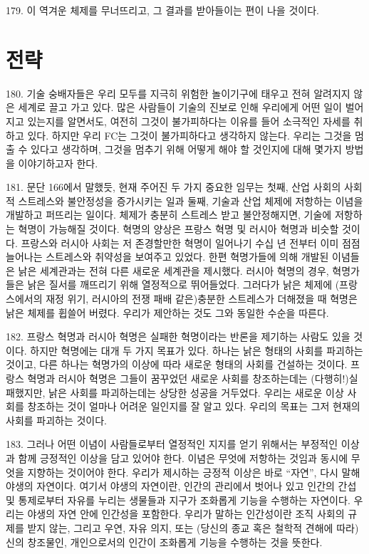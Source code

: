 \documentclass[11pt,a4paper]{article}
\begin{document}
\begin{multicols}{2}
179. 이 역겨운 체제를 무너뜨리고, 그 결과를 받아들이는 편이 나을 것이다.  


\section*{전략}
180. 기술 숭배자들은 우리 모두를 지극히 위험한 놀이기구에 태우고 전혀 알려지지 않은 세계로 끌고  가고 있다. 많은 사람들이 기술의 진보로 인해 우리에게 어떤 일이 벌어지고 있는지를 알면서도, 여전히  그것이 불가피하다는 이유를 들어 소극적인 자세를 취하고 있다. 하지만 우리 FC는 그것이 불가피하다고  생각하지 않는다. 우리는 그것을 멈출 수 있다고 생각하며, 그것을 멈추기 위해 어떻게 해야 할 것인지에  대해 몇가지 방법을 이야기하고자 한다.  


181. 문단 166에서 말했듯, 현재 주어진 두 가지 중요한 임무는 첫째, 산업 사회의 사회적 스트레스와  불안정성을 증가시키는 일과 둘째, 기술과 산업 체제에 저항하는 이념을 개발하고 퍼뜨리는 일이다.  체제가 충분히 스트레스 받고 불안정해지면, 기술에 저항하는 혁명이 가능해질 것이다. 혁명의 양상은  프랑스 혁명 및 러시아 혁명과 비슷할 것이다. 프랑스와 러시아 사회는 저 존경할만한 혁명이 일어나기  수십 년 전부터 이미 점점 늘어나는 스트레스와 취약성을 보여주고 있었다. 한편 혁명가들에 의해 개발된 이념들은 낡은 세계관과는 전혀 다른 새로운 세계관을 제시했다. 러시아 혁명의 경우, 혁명가들은 낡은  질서를 깨뜨리기 위해 열정적으로 뛰어들었다. 그러다가 낡은 체제에 (프랑스에서의 재정 위기, 러시아의 전쟁 패배 같은)충분한 스트레스가 더해졌을 때 혁명은 낡은 체제를 휩쓸어 버렸다. 우리가 제안하는 것도 그와 동일한 수순을 따른다.  


182. 프랑스 혁명과 러시아 혁명은 실패한 혁명이라는 반론을 제기하는 사람도 있을 것이다. 하지만  혁명에는 대개 두 가지 목표가 있다. 하나는 낡은 형태의 사회를 파괴하는 것이고, 다른 하나는 혁명가의  이상에 따라 새로운 형태의 사회를 건설하는 것이다. 프랑스 혁명과 러시아 혁명은 그들이 꿈꾸었던 새로운 사회를 창조하는데는 (다행히!)실패했지만, 낡은 사회를 파괴하는데는 상당한 성공을 거두었다.  우리는 새로운 이상 사회를 창조하는 것이 얼마나 어려운 일인지를 잘 알고 있다. 우리의 목표는 그저  현재의 사회를 파괴하는 것이다. 


183. 그러나 어떤 이념이 사람들로부터 열정적인 지지를 얻기 위해서는 부정적인 이상과 함께 긍정적인  이상을 담고 있어야 한다. 이념은 무엇에 저항하는 것임과 동시에 무엇을 지향하는 것이어야 한다. 우리가 제시하는 긍정적 이상은 바로 “자연”, 다시 말해 야생의 자연이다. 여기서 야생의 자연이란, 인간의  관리에서 벗어나 있고 인간의 간섭 및 통제로부터 자유를 누리는 생물들과 지구가 조화롭게 기능을  수행하는 자연이다. 우리는 야생의 자연 안에 인간성을 포함한다. 우리가 말하는 인간성이란 조직 사회의  규제를 받지 않는, 그리고 우연, 자유 의지, 또는 (당신의 종교 혹은 철학적 견해에 따라)신의 창조물인,  개인으로서의 인간이 조화롭게 기능을 수행하는 것을 뜻한다.  



\end{multicols}
\end{document}
